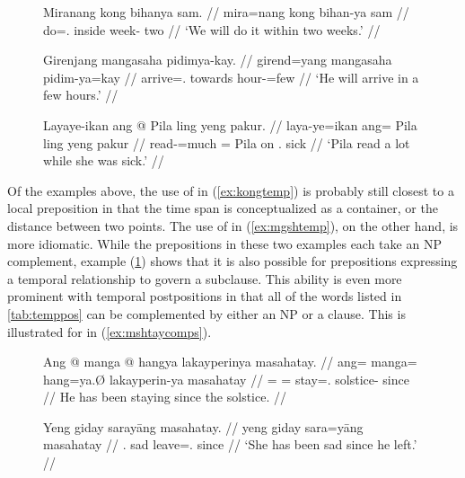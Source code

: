 \begin{figure}[h]
\pex
\a\label{ex:kongtemp}\begingl
	\gla Miranang kong bihanya sam. //
	\glb mira=nang kong bihan-ya sam //
	\glc do=\Fpl{}.\Aarg{} inside week-\Loc{} two //
	\glft `We will do it within two weeks.' //
\endgl

\a\label{ex:mgshtemp}\begingl
	\gla Girenjang mangasaha pidimya-kay. //
	\glb girend=yang mangasaha pidim-ya=kay //
	\glc arrive=\TsgM{}.\Aarg{} towards hour-\Loc{}=few //
	\glft `He will arrive in a few hours.' //
\endgl

\a\label{ex:lingtemp}\begingl
	\gla Layaye-ikan ang @ Pila ling yeng pakur. //
	\glb laya-ye=ikan ang= Pila ling yeng pakur //
	\glc read-\TsgF{}=much \Aarg{}= Pila on \TsgF{}.\Aarg{} sick //
	\glft `Pila read a lot while she was sick.' //
\endgl
\xe
\end{figure}

Of the examples above, the use of  in (\ref{ex:kongtemp}) is
probably still closest to a local preposition in that the time span is
conceptualized as a container, or the distance between two points. The use of
 in (\ref{ex:mgshtemp}), on the other hand, is more
idiomatic. While the prepositions in these two examples each take an NP
complement, example (\ref{ex:lingtemp}) shows that it is also possible for
prepositions expressing a temporal relationship to govern a subclause. This
ability is even more prominent with temporal postpositions in that all of the
words listed in \autoref{tab:temppos} can be complemented by either an NP or a
clause. This is illustrated for  in
(\ref{ex:mshtaycomps}).

\begin{figure}[h]
\pex\label{ex:mshtaycomps}
\a\label{ex:mshtaynp}\begingl
	\gla Ang @ manga @ hangya lakayperinya masahatay. //
	\glb ang= manga= hang=ya.Ø lakayperin-ya masahatay //
	\glc \AgtT{}= \Prog{}= stay=\TsgM{}.\Top{} solstice-\Loc{} since //
	\glft He has been staying since the solstice. //
\endgl

\a\label{ex:mshtays}\begingl
	\gla Yeng giday sarayāng masahatay. //
	\glb yeng giday sara=yāng masahatay //
	\glc \TsgF{}.\Aarg{} sad leave=\TsgM{}.\Aarg{} since //
	\glft `She has been sad since he left.' //
\endgl
\xe
\end{figure}

